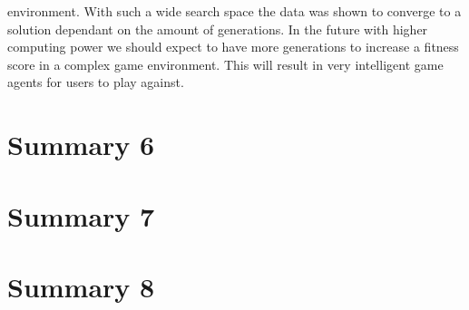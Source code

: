 \documentclass[12pt]{article} %
\begin{document}
environment. With such a wide search space the data was shown to converge to a solution dependant on the amount of generations. In the future with higher computing power we should expect  to have more generations to increase a fitness score in a complex game environment. This will result in very intelligent game agents for users to play against. 

\section{Summary 6} %

\section{Summary 7} %

\section{Summary 8} %



\newpage

\nocite{*}


 

\end{document}
